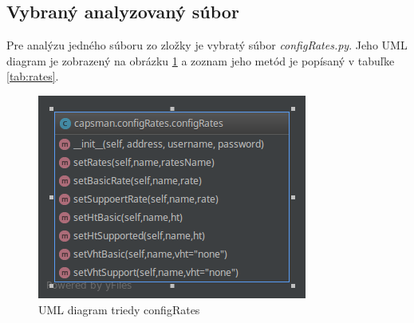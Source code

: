 \subsection{Vybraný analyzovaný súbor}
Pre analýzu jedného súboru zo zložky je vybratý súbor \textit{configRates.py}. Jeho UML diagram je zobrazený na obrázku \ref{fig:capsman1} a zoznam jeho metód je popísaný v tabuľke \ref{tab:rates}.
\begin{figure}[H]
\centering
\includegraphics[scale=0.6]{../text/configRates.png}
\caption{UML diagram triedy configRates}
\label{fig:capsman1}
\end{figure}
